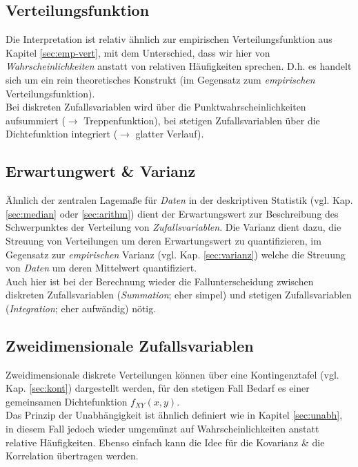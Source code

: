 \documentclass[a4paper]{article}
\newcommand\dangersign{%
 \makebox[1.8em][c]{%
 \makebox[0pt][c]{\raisebox{.15em}{\small!}}%
 \makebox[0pt][c]{\color{red}\Large$\triangle$}}}%
\begin{document}
\subsection{Verteilungsfunktion}\label{sec:vtlgfkt}

Die Interpretation ist relativ ähnlich zur empirischen Verteilungsfunktion aus Kapitel \ref{sec:emp-vert}, mit dem Unterschied, dass wir hier von \textit{Wahrscheinlichkeiten} anstatt von relativen Häufigkeiten sprechen. D.h. es handelt sich um ein rein theoretisches Konstrukt (im Gegensatz zum \textit{empirischen} Verteilungsfunktion).\\

\noindent \dangersign Bei diskreten Zufallsvariablen wird über die Punktwahrscheinlichkeiten aufsummiert ($\rightarrow$ Treppenfunktion), bei stetigen Zufallsvariablen über die Dichtefunktion integriert ($\rightarrow$ glatter Verlauf).

\subsection{Erwartungwert \& Varianz}\label{sec:ex-var}

Ähnlich der zentralen Lagemaße für \textit{Daten} in der deskriptiven Statistik (vgl. Kap. \ref{sec:median} oder \ref{sec:arithm}) dient der Erwartungswert zur Beschreibung des Schwerpunktes der Verteilung von \textit{Zufallsvariablen}. Die Varianz dient dazu, die Streuung von Verteilungen um deren Erwartungswert zu quantifizieren, im Gegensatz zur \textit{empirischen} Varianz (vgl. Kap. \ref{sec:varianz}) welche die Streuung von \textit{Daten} um deren Mittelwert quantifiziert.\\

\noindent \dangersign Auch hier ist bei der Berechnung wieder die Fallunterscheidung zwischen diskreten Zufallsvariablen (\textit{Summation}; eher simpel) und stetigen Zufallsvariablen (\textit{Integration}; eher aufwändig) nötig.

\subsection{Zweidimensionale Zufallsvariablen}\label{sec:2zv}

Zweidimensionale diskrete Verteilungen können über eine Kontingenztafel (vgl. Kap. \ref{sec:kont}) dargestellt werden, für den stetigen Fall Bedarf es einer gemeinsamen Dichtefunktion $f_{XY}(x,y)$.\\
Das Prinzip der Unabhängigkeit ist ähnlich definiert wie in Kapitel \ref{sec:unabh}, in diesem Fall jedoch wieder umgemünzt auf Wahrscheinlichkeiten anstatt relative Häufigkeiten. Ebenso einfach kann die Idee für die Kovarianz \& die Korrelation übertragen werden.
\end{document}
